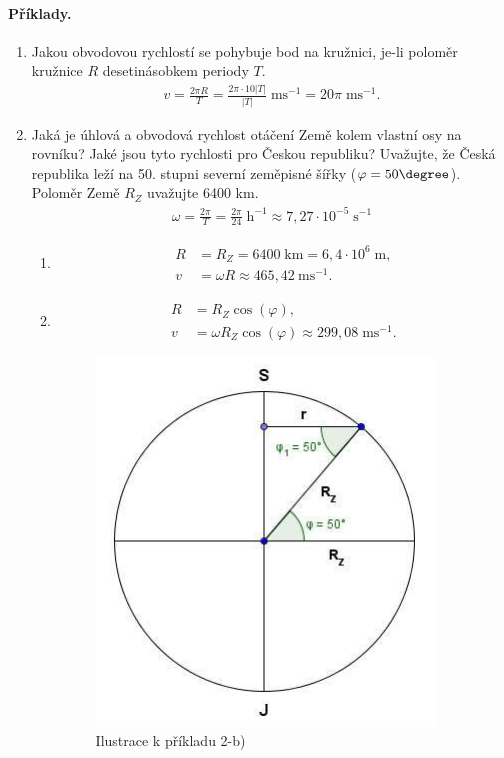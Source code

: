 \documentclass[11pt,a4paper]{article}
\begin{document}
        \paragraph*{Příklady.}
        \begin{enumerate}
            \item Jakou obvodovou rychlostí se pohybuje bod na kružnici, je-li poloměr kružnice $R$ desetinásobkem periody $T$.
            \begin{align*}
                v = \frac{2 \pi R}{T} = \frac{2 \pi \cdot 10 |T|}{|T|} \; \mathrm{ms}^{-1} = 20\pi \; \mathrm{ms}^{-1}.
            \end{align*}

            \item Jaká je úhlová a obvodová rychlost otáčení Země kolem vlastní osy na rovníku? Jaké jsou tyto rychlosti pro Českou republiku? Uvažujte, že Česká republika leží na 50. stupni severní zeměpisné šířky ($\varphi = 50 \degree$).
            Poloměr Země $R_Z$ uvažujte 6400 km.
            \begin{align*}
                \omega = \frac{2\pi}{T} = \frac{2\pi}{24} \; \mathrm h^{-1} \approx 7,27 \cdot 10^{-5} \; \mathrm s^{-1}
            \end{align*}
            \begin{enumerate}[label=(\alph*)]
                \item \begin{align*}
                    R &= R_Z = 6400 \; \mathrm{km} = 6,4 \cdot 10^{6} \; \mathrm m,
                \\
                    v &= \omega R \approx 465,42 \: \mathrm{ms}^{-1}.
                \end{align*}

                \item 
                \begin{align*}
                    R &= R_Z \cos(\varphi),
                \\
                    v &= \omega R_Z \cos(\varphi) \approx 299,08 \; \mathrm{ms}^{-1}.
                \end{align*}
                \begin{figure}[h!]
                    \centering
                    \includegraphics[width=0.4\linewidth]{figs/kin5.png}
                    \caption{Ilustrace k příkladu 2-b)}
                \end{figure}
            \end{enumerate}


\end{enumerate}
\end{document}
